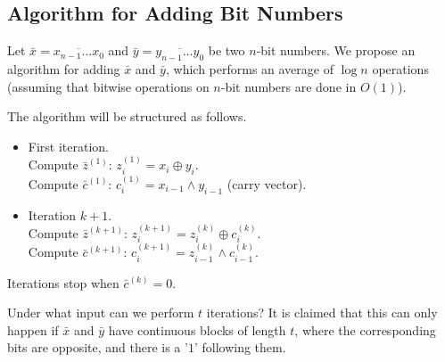 \documentclass[12pt,sans]{article}
\theoremstyle{definition}
\theoremstyle{plain}
\theoremstyle{remark}
\begin{document}
\subsection{Algorithm for Adding Bit Numbers}
Let $\bar x = \overline{x_{n-1}\dotso x_0}$ and $\bar y = \overline{y_{n-1}\dotso y_0}$ be two $n$-bit numbers. We propose an algorithm for adding $\bar x$ and $\bar y$, which performs an average of $\log n$ operations (assuming that bitwise operations on $n$-bit numbers are done in $O(1)$).

The algorithm will be structured as follows.
\begin{itemize}
    \item First iteration.\\
    Compute $\bar z^{(1)}$: $z_i^{(1)} = x_i \oplus y_i$.\\
    Compute $\bar c^{(1)}$: $c_i^{(1)} = x_{i-1} \land y_{i-1}$ (carry vector).
    \item Iteration $k+1$.\\
    Compute $\bar z^{(k+1)}$: $z_i^{(k+1)} = z_i^{(k)} \oplus c_i^{(k)}$.\\
    Compute $\bar c^{(k+1)}$: $c_i^{(k+1)} = z_{i-1}^{(k)} \land c_{i-1}^{(k)}$.
\end{itemize}
Iterations stop when $\bar c^{(k)} = 0$.

Under what input can we perform $t$ iterations? It is claimed that this can only happen if $\bar x$ and $\bar y$ have continuous blocks of length $t$, where the corresponding bits are opposite, and there is a '$1$' following them.
\begin{center}
\end{center}
\end{document}
